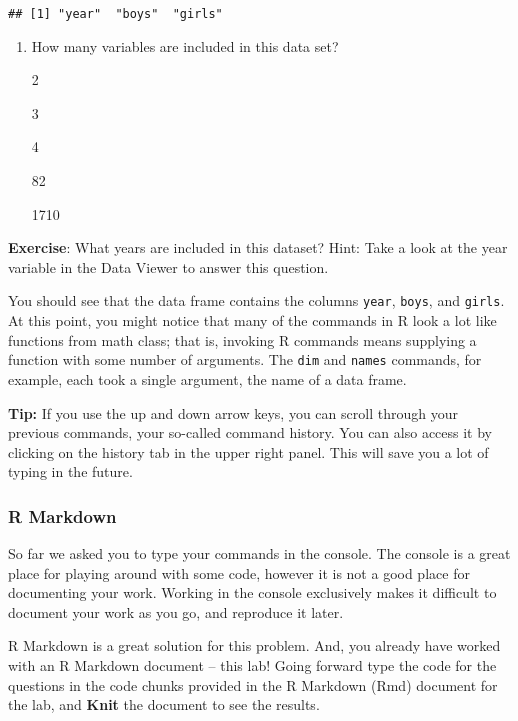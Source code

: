 \documentclass[
]{article}
\providecommand{\tightlist}{%
  \setlength{\itemsep}{0pt}\setlength{\parskip}{0pt}}
\begin{document}
\begin{verbatim}
## [1] "year"  "boys"  "girls"
\end{verbatim}

\begin{enumerate}
\def\labelenumi{\arabic{enumi}.}
\tightlist
\item
  How many variables are included in this data set?

  2

  3

  4

  82

  1710
\end{enumerate}

\label{exercise}
\textbf{Exercise}: What years are included in this dataset? Hint: Take a
look at the year variable in the Data Viewer to answer this question.

You should see that the data frame contains the columns \texttt{year},
\texttt{boys}, and \texttt{girls}. At this point, you might notice that
many of the commands in R look a lot like functions from math class;
that is, invoking R commands means supplying a function with some number
of arguments. The \texttt{dim} and \texttt{names} commands, for example,
each took a single argument, the name of a data frame.

\label{boxedtext}
\textbf{Tip: } If you use the up and down arrow keys, you can scroll
through your previous commands, your so-called command history. You can
also access it by clicking on the history tab in the upper right panel.
This will save you a lot of typing in the future.

\subsubsection{R Markdown}\label{r-markdown}

So far we asked you to type your commands in the console. The console is
a great place for playing around with some code, however it is not a
good place for documenting your work. Working in the console exclusively
makes it difficult to document your work as you go, and reproduce it
later.

R Markdown is a great solution for this problem. And, you already have
worked with an R Markdown document -- this lab! Going forward type the
code for the questions in the code chunks provided in the R Markdown
(Rmd) document for the lab, and \textbf{Knit} the document to see the
results.
\end{document}
